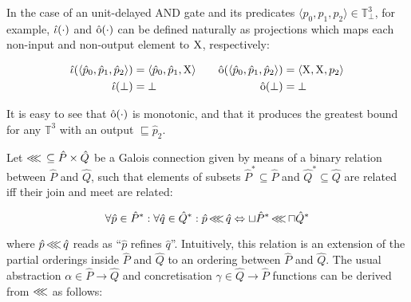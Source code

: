 

In the case of an unit-delayed AND gate and its predicates $\langle p_{0}, p_{1}, p_{2} \rangle \in \mathbb{T}_{\bot}^{3}$, for example, $\operatorname{\hat{\iota}}(\cdot)$ and $\operatorname{\hat{\mathrm{o}}}(\cdot)$ can be defined naturally as projections which maps each non-input and non-output element to $\mathrm{X}$, respectively:

\begin{equation*}
\begin{aligned}[t]
\operatorname{\hat{\iota}}(\langle \hat p_{0}, \hat p_{1}, \hat p_{2} \rangle) &= \langle \hat p_{0}, \hat p_{1}, \mathrm{X} \rangle \\
\operatorname{\hat{\iota}}(\bot) &= \bot
\end{aligned}
\qquad
\begin{aligned}[t]
\operatorname{\hat{\mathrm{o}}}(\langle \hat p_{0}, \hat p_{1}, \hat p_{2} \rangle) &= \langle \mathrm{X}, \mathrm{X}, p_{2} \rangle \\
\operatorname{\hat{\mathrm{o}}}(\bot) &= \bot
\end{aligned}
\end{equation*}

\noindent It is easy to see that $\operatorname{\hat{\mathrm{o}}}(\cdot)$ is monotonic, and that it produces the greatest bound for any $\mathbb{T}^{3}$ with an output $\sqsubseteq \hat p_{2}$.

Let $\operatorname{\lll} \, \subseteq \hat P \times \hat Q$ be a Galois connection given by means of a binary relation between $\hat P$ and $\hat Q$, such that elements of subsets $\hat P^{*} \subseteq \hat P$ and $\hat Q^{*} \subseteq \hat Q$ are related iff their join and meet are related:

\begin{equation*}
\forall \hat p \in \hat P^{*} : \forall \hat q \in \hat Q^{*} : \hat p \operatorname{\lll} \hat q \Leftrightarrow \sqcup \hat P^{*} \operatorname{\lll} \sqcap \hat Q^{*}
\end{equation*}

\noindent where $\hat p \operatorname{\lll} \hat q$ reads as ``$\hat p$ refines $\hat q$''. Intuitively, this relation is an extension of the partial orderings inside $\hat P$ and $\hat Q$ to an ordering between $\hat P$ and $\hat Q$. The usual abstraction $\alpha \in \hat P \rightarrow \hat Q$ and concretisation $\gamma \in \hat Q \rightarrow \hat P$ functions can be derived from $\operatorname{\lll}$ as follows:

